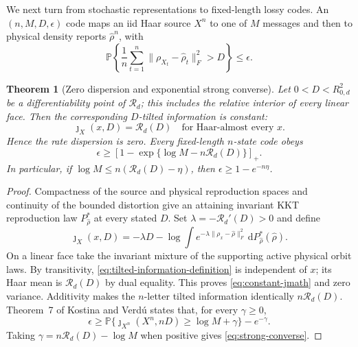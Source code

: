 \documentclass[11pt,a4paper]{article}
\newtheorem{theorem}{Theorem}[section]
\theoremstyle{remark}
\newcommand{\Pp}{\mathbb{P}}
\newcommand{\cR}{\mathcal{R}}
\newcommand{\dd}{\,\mathrm{d}}
\begin{document}
We next turn from stochastic representations to fixed-length lossy codes.  An
$(n,M,D,\epsilon)$ code maps an iid Haar source $X^n$ to one of $M$ messages
and then to physical density reports $\widehat\rho^n$, with
\begin{equation}
 \Pp\left\{\frac1n\sum_{t=1}^n
 \|\rho_{X_t}-\widehat\rho_t\|_F^2>D\right\}\le\epsilon.
 \label{eq:excess-distortion-event}
\end{equation}

\begin{theorem}[Zero dispersion and exponential strong converse]
\label{thm:strong-converse}
Let $0<D<R_{0,d}^2$ be a differentiability point of $\cR_d$; this includes
the relative interior of every linear face.  Then the corresponding
$D$-tilted information is constant:
\begin{equation}
 \jmath_X(x,D)=\cR_d(D)
 \quad\text{for Haar-almost every }x.
 \label{eq:constant-jmath}
\end{equation}
Hence the rate dispersion is zero.  Every fixed-length $n$-state code obeys
\begin{equation}
 \boxed{\epsilon\ge
 \left[1-\exp\{\log M-n\cR_d(D)\}\right]_+.}
 \label{eq:strong-converse}
\end{equation}
In particular, if $\log M\le n(\cR_d(D)-\eta)$, then
$\epsilon\ge1-e^{-n\eta}$.
\end{theorem}

\begin{proof}
Compactness of the source and physical reproduction spaces and continuity of
the bounded distortion give an attaining invariant KKT reproduction law
$P^*_{\widehat\rho}$ at every stated $D$.  Set
$\lambda=-\cR_d'(D)>0$ and define
\begin{equation}
 \jmath_X(x,D)=-\lambda D-
 \log\int e^{-\lambda\|\rho_x-\widehat\rho\|_F^2}
 \dd P^*_{\widehat\rho}(\widehat\rho).
 \label{eq:tilted-information-definition}
\end{equation}
On a linear face take the invariant mixture of the supporting active physical
orbit laws.  By transitivity, \eqref{eq:tilted-information-definition} is
independent of $x$; its Haar mean is $\cR_d(D)$ by dual equality.  This
proves \eqref{eq:constant-jmath} and zero variance.  Additivity makes the
$n$-letter tilted information identically $n\cR_d(D)$.  Theorem~7 of Kostina
and Verd\'u \cite{KostinaVerdu2012} states that, for every $\gamma\ge0$,
\begin{equation}
 \epsilon\ge
 \Pp\{\jmath_{X^n}(X^n,nD)\ge\log M+\gamma\}-e^{-\gamma}.
\end{equation}
Taking $\gamma=n\cR_d(D)-\log M$ when positive gives
\eqref{eq:strong-converse}.
\end{proof}
\end{document}
